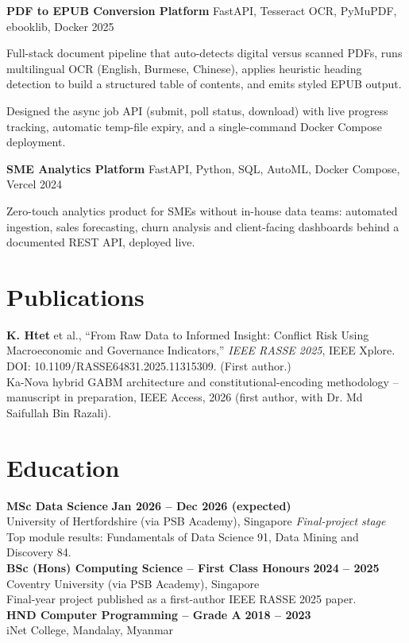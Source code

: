 \documentclass[letterpaper,10pt]{article}
\newcommand{\project}[3]{%
  \textbf{#1} \textbar{} #2 \hfill #3\\[1pt]
}
\begin{document}
\vspace{3pt}
\project{PDF to EPUB Conversion Platform}{FastAPI, Tesseract OCR, PyMuPDF, ebooklib, Docker}{2025}
\begin{tight}
  \item Full-stack document pipeline that auto-detects digital versus scanned PDFs, runs
  multilingual OCR (English, Burmese, Chinese), applies heuristic heading detection to build
  a structured table of contents, and emits styled EPUB output.
  \item Designed the async job API (submit, poll status, download) with live progress
  tracking, automatic temp-file expiry, and a single-command Docker Compose deployment.
\end{tight}

\vspace{3pt}
\project{SME Analytics Platform}{FastAPI, Python, SQL, AutoML, Docker Compose, Vercel}{2024}
\begin{tight}
  \item Zero-touch analytics product for SMEs without in-house data teams: automated
  ingestion, sales forecasting, churn analysis and client-facing dashboards behind a
  documented REST API, deployed live.
\end{tight}

\section*{Publications}
\textbf{K. Htet} et al., ``From Raw Data to Informed Insight: Conflict Risk Using
Macroeconomic and Governance Indicators,'' \textit{IEEE RASSE 2025}, IEEE Xplore.
DOI: 10.1109/RASSE64831.2025.11315309. (First author.)\\[2pt]
Ka-Nova hybrid GABM architecture and constitutional-encoding methodology -- manuscript in
preparation, IEEE Access, 2026 (first author, with Dr. Md Saifullah Bin Razali).

\section*{Education}
\textbf{MSc Data Science} \hfill \textbf{Jan 2026 -- Dec 2026 (expected)}\\
University of Hertfordshire (via PSB Academy), Singapore \hfill \textit{Final-project stage}\\
Top module results: Fundamentals of Data Science 91, Data Mining and Discovery 84.\\[3pt]
\textbf{BSc (Hons) Computing Science -- First Class Honours} \hfill \textbf{2024 -- 2025}\\
Coventry University (via PSB Academy), Singapore\\
Final-year project published as a first-author IEEE RASSE 2025 paper.\\[3pt]
\textbf{HND Computer Programming -- Grade A} \hfill \textbf{2018 -- 2023}\\
iNet College, Mandalay, Myanmar
\end{document}

